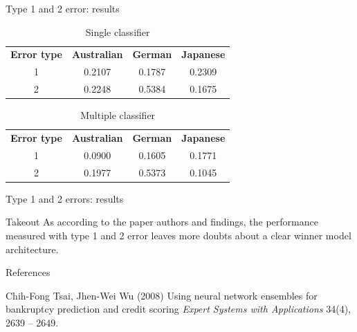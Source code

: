 \documentclass[12pt]{beamer}
\begin{document}
\begin{frame}{Type 1 and 2 error: results}
  \begin{table}[htbp]
  \centering
  \caption{Single classifier}
    \begin{tabular}{cccc}
    \textbf{Error type} & \textbf{Australian} & \textbf{German} & \textbf{Japanese} \\
    1 & 0.2107  & 0.1787  & 0.2309 \\
    2 & 0.2248  & 0.5384  & 0.1675 \\
    \bottomrule
    \end{tabular}%
  \label{tab:data1}%
\end{table}%

\begin{table}[htbp]
  \centering
  \caption{Multiple classifier}
    \begin{tabular}{cccc}
    \textbf{Error type} & \textbf{Australian} & \textbf{German} & \textbf{Japanese} \\
    1 & 0.0900 & 0.1605 & 0.1771 \\
    2 & 0.1977 & 0.5373 & 0.1045 \\
    \bottomrule
    \end{tabular}%
  \label{tab:data2}%
\end{table}%

\end{frame}

\begin{frame}{Type 1 and 2 errors: results}
  \begin{block}{Takeout}
    As according to the paper authors and findings, the performance measured with
    type 1 and 2 error leaves more doubts about a clear winner model architecture.
  \end{block}
\end{frame}


\begin{frame}{References}
    \footnotesize{
        \begin{thebibliography}{99}
             Chih-Fong Tsai, Jhen-Wei Wu (2008)
            \newblock Using neural network ensembles for bankruptcy prediction and credit
           scoring
            \newblock \emph{Expert Systems with Applications} 34(4), 2639 -- 2649.
        \end{thebibliography}
    }
\end{frame}
\end{document}
